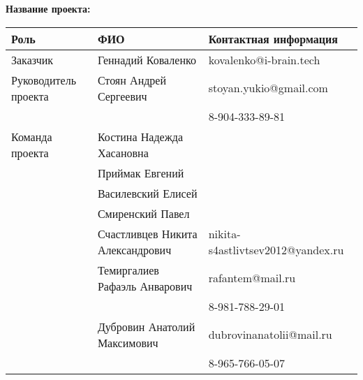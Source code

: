 \documentclass[a4paper,12pt]{article}
\begin{document}
\textbf{Название проекта: }

\vspace{5ex}


\begin{tabular}{|l|l|l|}
    \hline
    \textbf{Роль} & \textbf{ФИО} & \textbf{Контактная информация} \\
    \hline 
    Заказчик & Геннадий Коваленко & kovalenko@i-brain.tech \\
    \hline
    Руководитель проекта & Стоян Андрей Сергеевич 
       & stoyan.yukio@gmail.com \\ 
     & & 8-904-333-89-81 \\ 
    \hline
    Команда проекта 
     & Костина Надежда Хасановна & \\ \cline{2-3}
     & Приймак Евгений & \\ \cline{2-3}
     & Василевский Елисей & \\ \cline{2-3}
     & Смиренский Павел & \\ \cline{2-3}
     & Счастливцев Никита Александрович 
       & nikita-s4astlivtsev2012@yandex.ru \\ \cline{2-3}
     & Темиргалиев Рафаэль Анварович
       & rafantem@mail.ru \\
     & & 8-981-788-29-01 \\ \cline{2-3}
     & Дубровин Анатолий Максимович
       & dubrovinanatolii@mail.ru \\ 
     & & 8-965-766-05-07 \\
    \hline
\end{tabular}
\end{document}
